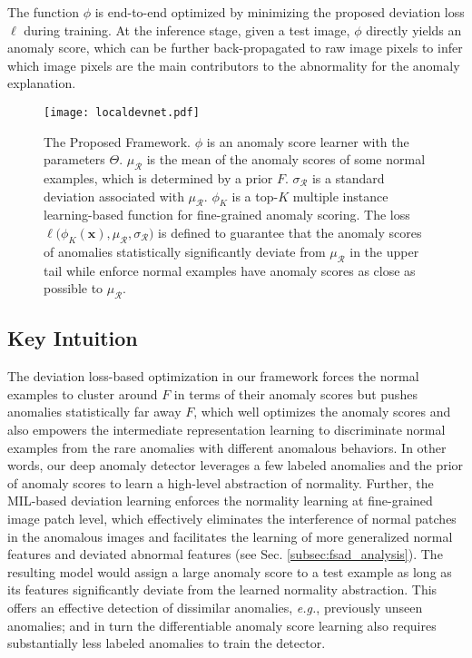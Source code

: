 \documentclass[10pt,journal,compsoc]{IEEEtran}
\newcommand{\eg}{\textit{e.g.}}
\begin{document}
The function $\phi$ is end-to-end optimized by minimizing the proposed deviation loss $\ell$ during training. At the inference stage, given a test image, $\phi$ directly yields an anomaly score, which can be further back-propagated to raw image pixels to infer which image pixels are the main contributors to the abnormality for the anomaly explanation.
 
\begin{figure*}[h!]
  \centering
    \texttt{[image: localdevnet.pdf]}
  \caption{The Proposed Framework. $\phi$ is an anomaly score learner with the parameters $\Theta$. $\mu_{\mathcal{R}}$ is the mean of the anomaly scores of some normal examples, which is determined by a prior $F$. $\sigma_{\mathcal{R}}$ is a standard deviation associated with $\mu_{\mathcal{R}}$. $\phi_K$ is a top-$K$ multiple instance learning-based function for fine-grained anomaly scoring. The loss $\ell\big(\phi_K(\mathbf{x}), \mu_{\mathcal{R}}, \sigma_{\mathcal{R}}\big)$ is defined to guarantee that the anomaly scores of anomalies statistically significantly deviate from $\mu_{\mathcal{R}}$ in the upper tail while enforce normal examples have anomaly scores as close as possible to $\mu_{\mathcal{R}}$. }
  \label{fig:framework}
\end{figure*}


\subsection{Key Intuition}

The deviation loss-based optimization in our framework forces the normal examples to cluster around $F$ in terms of their anomaly scores but pushes anomalies statistically far away $F$, which well optimizes the anomaly scores and also empowers the intermediate representation learning to discriminate normal examples from the rare anomalies with different anomalous behaviors. In other words, our deep anomaly detector leverages a few labeled anomalies and the prior of anomaly scores to learn a high-level abstraction of normality. Further, the MIL-based deviation learning enforces the normality learning at fine-grained image patch level, which effectively eliminates the interference of normal patches in the anomalous images and facilitates the learning of more generalized normal features and deviated abnormal features (see Sec. \ref{subsec:fsad_analysis}). The resulting model would assign a large anomaly score to a test example as long as its features significantly deviate from the learned normality abstraction. This offers an effective detection of dissimilar anomalies, \eg, previously unseen anomalies; and in turn the differentiable anomaly score learning also requires substantially less labeled anomalies to train the detector.
\end{document}
